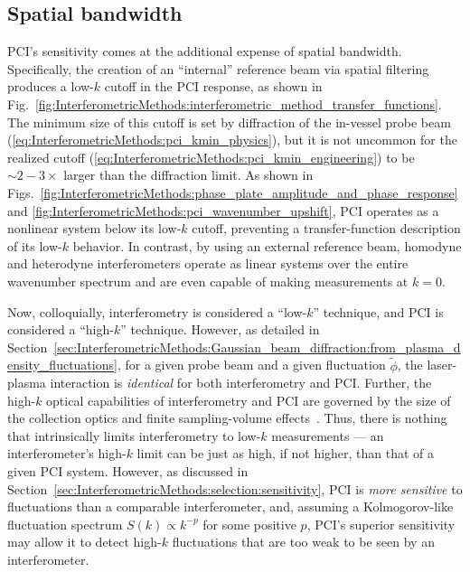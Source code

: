 \subsection{Spatial bandwidth}
PCI's sensitivity comes at the additional expense of spatial bandwidth.
Specifically, the creation of an ``internal'' reference beam
via spatial filtering
produces a low-$k$ cutoff in the PCI response, as shown in
Fig.~\ref{fig:InterferometricMethods:interferometric_method_transfer_functions}.
The minimum size of this cutoff is
set by diffraction of the in-vessel probe beam
(\ref{eq:InterferometricMethods:pci_kmin_physics}), but
it is not uncommon for the realized cutoff
(\ref{eq:InterferometricMethods:pci_kmin_engineering})
to be $\sim 2-3\times$ larger than the diffraction limit.
As shown in Figs.~\ref{fig:InterferometricMethods:phase_plate_amplitude_and_phase_response}
and \ref{fig:InterferometricMethods:pci_wavenumber_upshift},
PCI operates as a nonlinear system below its low-$k$ cutoff,
preventing a transfer-function description of its low-$k$ behavior.
In contrast, by using an external reference beam,
homodyne and heterodyne interferometers
operate as linear systems over the entire wavenumber spectrum and
are even capable of making measurements at $k = 0$.

Now, colloquially, interferometry is considered a ``low-$k$'' technique, and
PCI is considered a ``high-$k$'' technique.
However, as detailed in
Section~\ref{sec:InterferometricMethods:Gaussian_beam_diffraction:from_plasma_density_fluctuations},
for a given probe beam and a given fluctuation $\tilde{\phi}$,
the laser-plasma interaction is \emph{identical}
for both interferometry and PCI.
Further, the high-$k$ optical capabilities of interferometry and PCI
are governed by the size of the collection optics
and finite sampling-volume effects~\cite{bravenec_rsi95}.
Thus, there is nothing that intrinsically limits
interferometry to low-$k$ measurements ---
an interferometer's high-$k$ limit
can be just as high, if not higher,
than that of a given PCI system.
However, as discussed in
Section~\ref{sec:InterferometricMethods:selection:sensitivity},
PCI is \emph{more sensitive} to fluctuations
than a comparable interferometer, and,
assuming a Kolmogorov-like fluctuation spectrum
$S(k) \propto k^{-p}$ for some positive $p$,
PCI's superior sensitivity may allow it
to detect high-$k$ fluctuations
that are too weak to be seen by an interferometer.


